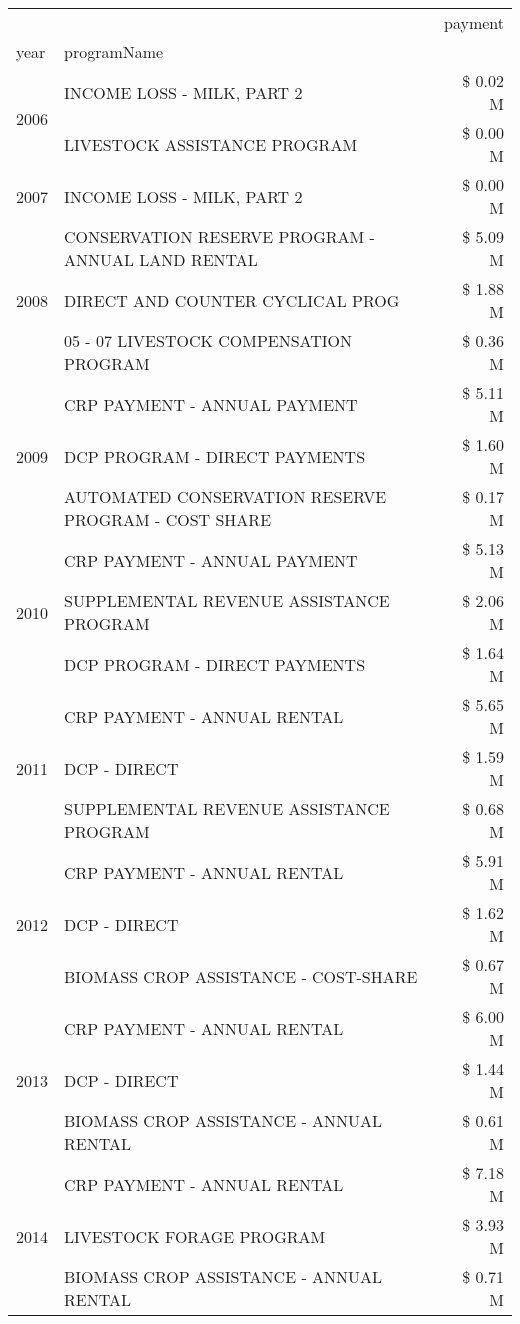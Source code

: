 \begin{tabular}{llr}
\toprule
 &  & payment \\
year & programName &  \\
\midrule
\multirow[t]{2}{*}{2006} & INCOME LOSS - MILK, PART 2 & \$ 0.02 M \\
 & LIVESTOCK ASSISTANCE PROGRAM & \$ 0.00 M \\
\cline{1-3}
2007 & INCOME LOSS - MILK, PART 2 & \$ 0.00 M \\
\cline{1-3}
\multirow[t]{3}{*}{2008} & CONSERVATION RESERVE PROGRAM - ANNUAL LAND RENTAL & \$ 5.09 M \\
 & DIRECT AND COUNTER CYCLICAL PROG & \$ 1.88 M \\
 & 05 - 07 LIVESTOCK COMPENSATION PROGRAM & \$ 0.36 M \\
\cline{1-3}
\multirow[t]{3}{*}{2009} & CRP PAYMENT - ANNUAL PAYMENT & \$ 5.11 M \\
 & DCP PROGRAM - DIRECT PAYMENTS & \$ 1.60 M \\
 & AUTOMATED CONSERVATION RESERVE PROGRAM - COST SHARE & \$ 0.17 M \\
\cline{1-3}
\multirow[t]{3}{*}{2010} & CRP PAYMENT - ANNUAL PAYMENT & \$ 5.13 M \\
 & SUPPLEMENTAL REVENUE ASSISTANCE PROGRAM & \$ 2.06 M \\
 & DCP PROGRAM - DIRECT PAYMENTS & \$ 1.64 M \\
\cline{1-3}
\multirow[t]{3}{*}{2011} & CRP PAYMENT - ANNUAL RENTAL & \$ 5.65 M \\
 & DCP - DIRECT & \$ 1.59 M \\
 & SUPPLEMENTAL REVENUE ASSISTANCE PROGRAM & \$ 0.68 M \\
\cline{1-3}
\multirow[t]{3}{*}{2012} & CRP PAYMENT - ANNUAL RENTAL & \$ 5.91 M \\
 & DCP - DIRECT & \$ 1.62 M \\
 & BIOMASS CROP ASSISTANCE - COST-SHARE & \$ 0.67 M \\
\cline{1-3}
\multirow[t]{3}{*}{2013} & CRP PAYMENT - ANNUAL RENTAL & \$ 6.00 M \\
 & DCP - DIRECT & \$ 1.44 M \\
 & BIOMASS CROP ASSISTANCE - ANNUAL RENTAL & \$ 0.61 M \\
\cline{1-3}
\multirow[t]{3}{*}{2014} & CRP PAYMENT - ANNUAL RENTAL & \$ 7.18 M \\
 & LIVESTOCK FORAGE PROGRAM & \$ 3.93 M \\
 & BIOMASS CROP ASSISTANCE - ANNUAL RENTAL & \$ 0.71 M \\

\end{tabular}
